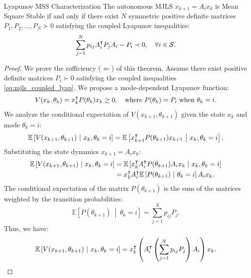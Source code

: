 \begin{mytheorem}{Lyapunov MSS Characterization}
The autonomous MJLS $x_{k+1} = A_i x_k$ is Mean Square Stable if and only if there exist $N$ symmetric positive definite matrices $P_1, P_2, \dots, P_N \succ 0$ satisfying the coupled Lyapunov inequalities:
\begin{equation}
    \sum_{j=1}^N p_{ij} A_i^\intercal P_j A_i - P_i \prec 0, \quad \forall i \in \mathcal{S} . \label{eq:mjls_coupled_lyap}
\end{equation}
\end{mytheorem}

\begin{proof}
We prove the sufficiency ($\Leftarrow$) of this theorem. Assume there exist positive definite matrices $P_i \succ 0$ satisfying the coupled inequalities \eqref{eq:mjls_coupled_lyap}. We propose a mode-dependent Lyapunov function:
\begin{equation}
V(x_k, \theta_k) = x_k^\intercal P(\theta_k) x_k \ge 0, \quad \text{where } P(\theta_k) = P_i \text{ when } \theta_k = i .
\end{equation}
We analyze the conditional expectation of $V(x_{k+1}, \theta_{k+1})$ given the state $x_k$ and mode $\theta_k = i$:
\begin{equation}
\mathbb{E}\left[ V(x_{k+1}, \theta_{k+1}) \ \middle| \ x_k, \theta_k = i \right] = \mathbb{E}\left[ x_{k+1}^\trp P(\theta_{k+1}) x_{k+1} \ \middle| \ x_k, \theta_k = i \right] .
\end{equation}
Substituting the state dynamics $x_{k+1} = A_i x_k$:
\begin{align}
    \mathbb{E}\left[ V(x_{k+1}, \theta_{k+1}) \ \middle| \ x_k, \theta_k = i \right] &= \mathbb{E}\left[ x_k^\trp A_i^\trp P(\theta_{k+1}) A_i x_k \ \middle| \ x_k, \theta_k = i \right] \nonumber \\
&= x_k^\trp A_i^\trp \mathbb{E}\left[ P(\theta_{k+1}) \ \middle| \ \theta_k = i \right] A_i x_k .
\end{align}
The conditional expectation of the matrix $P(\theta_{k+1})$ is the sum of the matrices weighted by the transition probabilities:
\begin{equation}
\mathbb{E}\left[ P(\theta_{k+1}) \ \middle| \ \theta_k = i \right] = \sum_{j=1}^N p_{ij} P_j .
\end{equation}
Thus, we have:
\begin{equation}
\mathbb{E}\left[ V(x_{k+1}, \theta_{k+1}) \ \middle| \ x_k, \theta_k = i \right] = x_k^\trp \left( A_i^\trp \left( \sum_{j=1}^N p_{ij} P_j \right) A_i \right) x_k .

\end{equation}
\end{proof}
